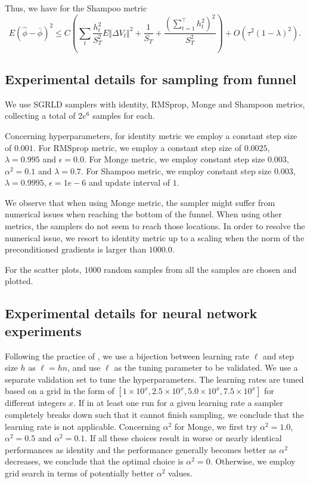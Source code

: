 \documentclass[10pt]{article} %
\theoremstyle{plain}
\theoremstyle{definition}
\theoremstyle{remark}
\begin{document}
Thus, we have for the Shampoo metric
\begin{equation*}
E\left(\hat{\phi}-\bar{\phi}\right)^{2} \leq C\left(\sum_{t}\frac{h_{t}^2}{S_{T}^{2}}E\Vert\Delta V_{t}\Vert^{2}+\frac{1}{S_T}+\frac{(\sum_{t=1}^{\top}h_{t}^2)^{2}}{S_{T}^2}\right) + O(\tau^{2}(1-\lambda)^{2}).
\end{equation*}

\subsection{Experimental details for sampling from funnel}
\label{app:expdetails}

 We use SGRLD samplers with identity, RMSprop, Monge and Shampoon metrics, collecting a total of $2e^6$ samples for each.
 
Concerning hyperparameters, for identity metric we employ a constant step size of $0.001$. For RMSprop metric, we employ a constant step size of $0.0025$, $\lambda = 0.995$ and $\epsilon=0.0$. For Monge metric, we employ constant step size $0.003$, $\alpha^{2}=0.1$ and $\lambda=0.7$. For Shampoo metric, we employ constant step size $0.003$, $\lambda = 0.9995$, $\epsilon = 1e-6$ and update interval of $1$.

We observe that when using Monge metric, the sampler might suffer from numerical issues when reaching the bottom of the funnel. When using other metrics, the samplers do not seem to reach those locations. In order to resolve the numerical issue, we resort to identity metric up to a scaling when the norm of the preconditioned gradients is larger than $1000.0$.

For the scatter plots, $1000$ random samples from all the samples are chosen and plotted.

\subsection{Experimental details for neural network experiments}
\label{app:expdetails2}

Following the practice of \cite{Wenzel2020}, we use a bijection between learning rate $\ell$ and step size $h$ as
$\ell = hn$, and use $\ell$ as the tuning parameter to be validated.
We use a separate validation set to tune the hyperparameters. The learning rates are tuned based on a grid in the form of $[1\times 10^{x}, 2.5\times 10^{x}, 5.0\times 10^{x}, 7.5\times 10^{x}]$ for different integers $x$.
If in at least one run for a given learning rate a sampler completely breaks down such that it cannot finish sampling, we conclude that the learning rate is not applicable. Concerning $\alpha^{2}$ for Monge, we first try $\alpha^{2}=1.0$, $\alpha^{2}=0.5$ and $\alpha^{2}=0.1$. If all these choices result in worse or nearly identical performances as identity and the performance generally becomes better as $\alpha^{2}$ decreases, we conclude that the optimal choice is $\alpha^{2}=0$. Otherwise, we employ grid search in terms of potentially better $\alpha^{2}$ values.
\end{document}
